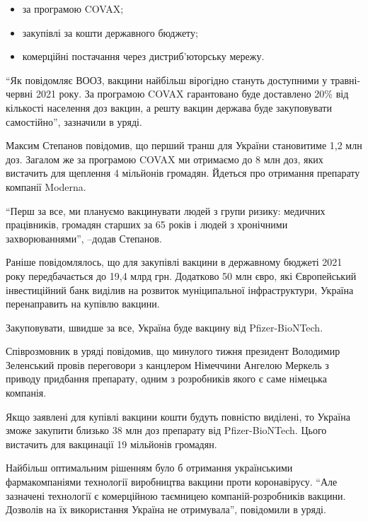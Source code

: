 \begin{itemize}
  \item за програмою COVAX;
  \item закупівлі за кошти державного бюджету;
  \item комерційні постачання через дистриб'юторську мережу.
\end{itemize}

\enquote{Як повідомляє ВООЗ, вакцини найбільш вірогідно стануть доступними у
травні-червні 2021 року. За програмою COVAX гарантовано буде доставлено 20\%
від кількості населення доз вакцин, а решту вакцин держава буде закуповувати
самостійно}, \dshM зазначили в уряді.

Максим Степанов повідомив, що перший транш для України становитиме 1,2 млн доз.
Загалом же за програмою COVAX ми отримаємо до 8 млн доз, яких вистачить для
щеплення 4 мільйонів громадян. Йдеться про отримання препарату компанії
Moderna.

\enquote{Перш за все, ми плануємо вакцинувати людей з групи ризику: медичних працівників, громадян старших за 65 років і людей з хронічними захворюваннями}, –додав Степанов.

Раніше повідомлялось, що для закупівлі вакцини в державному бюджеті 2021 року
передбачається до 19,4 млрд грн. Додатково 50 млн євро, які Європейський
інвестиційний банк виділив на розвиток муніципальної інфраструктури, Україна
перенаправить на купівлю вакцини.

Закуповувати, швидше за все, Україна буде вакцину від Pfizer-BioNTech.

Співрозмовник в уряді повідомив, що минулого тижня президент Володимир Зеленський провів переговори з канцлером Німеччини Ангелою Меркель з приводу придбання препарату, одним з розробників якого є саме німецька компанія.

Якщо заявлені для купівлі вакцини кошти будуть повністю виділені, то Україна зможе закупити близько 38 млн доз препарату від Pfizer-BioNTech. Цього вистачить для вакцинації 19 мільйонів громадян.

Найбільш оптимальним рішенням було б отримання українськими фармакомпаніями
технології виробництва вакцини проти коронавірусу. \enquote{Але зазначені технології є
комерційною таємницею компаній-розробників вакцини. Дозволів на їх використання
Україна не отримувала}, \dshM повідомили в уряді.
